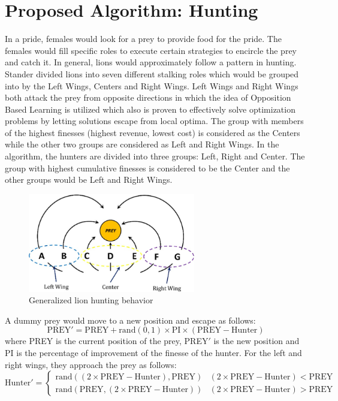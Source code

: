 \section{Proposed Algorithm: Hunting}
In a pride, females would look for a prey to provide food for the pride. The females would fill specific roles to execute certain strategies to encircle the prey and catch it. In general, lions would approximately follow a pattern in hunting. Stander divided lions into seven different stalking roles which would be grouped into by the Left Wings, Centers and Right Wings.
Left Wings and Right Wings both attack the prey from opposite directions in which the idea of Opposition Based Learning is utilized which also is proven to effectively solve optimization problems by letting solutions escape from local optima.
The group with members of the highest finesses (highest revenue, lowest cost) is considered as the Centers while the other two groups are considered as Left and Right Wings.
In the algorithm, the hunters are divided into three groups: Left, Right and Center. The group with highest cumulative finesses is considered to be the Center and the other groups would be Left and Right Wings.
\begin{figure}[h]
\begin{center}
\includegraphics[width=0.65\textwidth]{img/pa/hunting_scheme}
\caption{Generalized lion hunting behavior}
\end{center}
\end{figure}
A dummy prey would move to a new position and escape as follows:
$$\text{PREY}' = \text{PREY} + \text{rand}(0,1) \times \text{PI} \times (\text{PREY} - \text{Hunter})$$
where PREY is the current position of the prey, PREY$'$ is the new position and PI is the percentage of improvement of the finesse of the hunter.
For the left and right wings, they approach the prey as follows:
\[ \text{Hunter}' =  \begin{cases}
      \text{rand}((2 \times \text{PREY} - \text{Hunter}), \text{PREY}) & (2 \times \text{PREY} - \text{Hunter}) < \text{PREY} \\
      \text{rand}(\text{PREY}, (2 \times \text{PREY} - \text{Hunter})) & (2 \times \text{PREY} - \text{Hunter}) > \text{PREY}
   \end{cases}
\]
